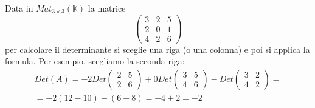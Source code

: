 \begin{example}
	Data in $Mat_{3 \times 3}(\mathbb{K})$ la matrice
	\begin{equation*}
		\begin{pmatrix}
			3 & 2 & 5 \\
			2 & 0 & 1 \\
			4 & 2 & 6
		\end{pmatrix}
	\end{equation*}
	per calcolare il determinante si sceglie una riga (o una colonna) e poi si
	applica la formula. Per esempio, scegliamo la seconda riga:
	\begin{gather*}
		Det(A) = -2Det \begin{pmatrix}
			2 & 5 \\
			2 & 6
		\end{pmatrix} +
		0 Det \begin{pmatrix}
			3 & 5 \\
			4 & 6
		\end{pmatrix} -
		Det \begin{pmatrix}
			3 & 2 \\
			4 & 2
		\end{pmatrix} = \\
		= -2(12 - 10) - (6 - 8) = -4 + 2 = -2
	\end{gather*}
\end{example}

